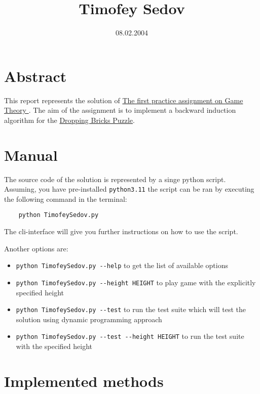 \documentclass{article}
\title{Timofey Sedov}
\author{08.02.2004}
\date{}
\begin{document}
\maketitle

\section{Abstract}
This report represents the solution of
\href{https://moodle.innopolis.university/pluginfile.php/193734/mod_resource/content/2/GT1spr2
    4.pdf}{ The first practice assignment on Game Theory }. The aim of the
assignment is to implement a backward induction algorithm for the
\href{https://en.wikipedia.org/wiki/Dynamic_programming#egg_dropping_puzzle}{Dropping
    Bricks Puzzle}.

\section{Manual}
The source code of the solution is represented by a singe python script.
Assuming, you have pre-installed \verb|python3.11| the script can be ran by
executing the following command in the terminal:

\begin{verbatim}
    python TimofeySedov.py
\end{verbatim}

The cli-interface will give you further instructions on how to use the script.

Another options are:
\begin{itemize}
    \item \verb|python TimofeySedov.py --help| to get the list of available options
    \item \verb|python TimofeySedov.py --height HEIGHT| to play game with the explicitly specified height
    \item \verb|python TimofeySedov.py --test| to run the test suite which will test the solution using dynamic programming approach
    \item \verb|python TimofeySedov.py --test --height HEIGHT| to run the test suite with the specified height
\end{itemize}

\section{Implemented methods}
\end{document}
